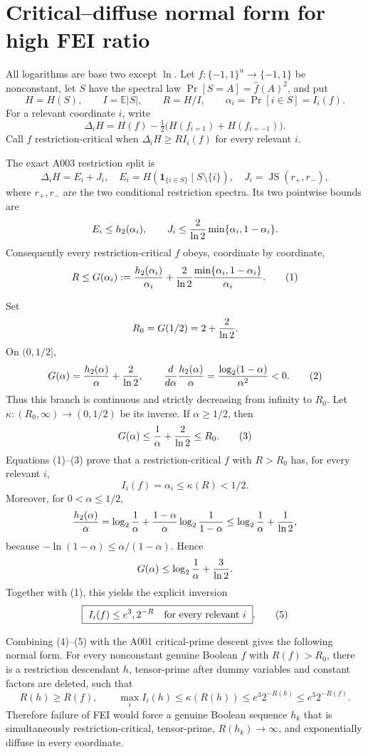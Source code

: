 \section*{Critical--diffuse normal form for high FEI ratio}

All logarithms are base two except \(\ln\).  Let \(f:\{-1,1\}^n\to
\{-1,1\}\) be nonconstant, let \(S\) have the spectral law
\(\Pr[S=A]=\widehat f(A)^2\), and put
\[
 H=H(S),\qquad I=\mathbb E|S|,\qquad R=H/I,
 \qquad \alpha_i=\Pr[i\in S]=I_i(f).
\]
For a relevant coordinate \(i\), write
\[
 \Delta_iH=H(f)-\tfrac12\bigl(H(f_{i=1})+H(f_{i=-1})\bigr).
\]
Call \(f\) restriction-critical when
\(\Delta_iH\ge R I_i(f)\) for every relevant \(i\).

The exact A003 restriction split is
\[
 \Delta_iH=E_i+J_i,
 \quad E_i=H(\mathbf1_{\{i\in S\}}\mid S\setminus\{i\}),
 \quad J_i=\operatorname{JS}(r_+,r_-),
\]
where \(r_+,r_-\) are the two conditional restriction spectra.  Its two
pointwise bounds are
\[
 E_i\le h_2(\alpha_i),\qquad
 J_i\le {2\over\ln2}\min\{\alpha_i,1-\alpha_i\}.
\]
Consequently every restriction-critical \(f\) obeys, coordinate by
coordinate,
\[
 R\le G(\alpha_i):={h_2(\alpha_i)\over\alpha_i}
   +{2\over\ln2}{\min\{\alpha_i,1-\alpha_i\}\over\alpha_i}. \tag{1}
\]

Set
\[
 R_0=G(1/2)=2+{2\over\ln2}.
\]
On \((0,1/2]\),
\[
 G(\alpha)={h_2(\alpha)\over\alpha}+{2\over\ln2},
 \qquad {d\over d\alpha}{h_2(\alpha)\over\alpha}
 ={\log_2(1-\alpha)\over\alpha^2}<0. \tag{2}
\]
Thus this branch is continuous and strictly decreasing from infinity to
\(R_0\).  Let \(\kappa:(R_0,\infty)\to(0,1/2)\) be its inverse.  If
\(\alpha\ge1/2\), then
\[
 G(\alpha)\le {1\over\alpha}+{2\over\ln2}\le R_0. \tag{3}
\]
Equations (1)--(3) prove that a restriction-critical \(f\) with \(R>R_0\)
has, for every relevant \(i\),
\[
 I_i(f)=\alpha_i\le\kappa(R)<1/2. \tag{4}
\]
Moreover, for \(0<\alpha\le1/2\),
\[
 {h_2(\alpha)\over\alpha}
 =\log_2{1\over\alpha}
  +{1-\alpha\over\alpha}\log_2{1\over1-\alpha}
 \le\log_2{1\over\alpha}+{1\over\ln2},
\]
because \(-\ln(1-\alpha)\le\alpha/(1-\alpha)\).  Hence
\[
 G(\alpha)\le\log_2{1\over\alpha}+{3\over\ln2}.
\]
Together with (1), this yields the explicit inversion
\[
 \boxed{\ I_i(f)\le e^3,2^{-R}\quad\hbox{for every relevant }i\ }.
 \tag{5}
\]

Combining (4)--(5) with the A001 critical-prime descent gives the following
normal form.  For every nonconstant genuine Boolean \(f\) with
\(R(f)>R_0\), there is a restriction descendant \(h\), tensor-prime after
dummy variables and constant factors are deleted, such that
\[
 R(h)\ge R(f),\qquad
 \max_i I_i(h)\le\kappa(R(h))\le e^3 2^{-R(h)}\le e^3 2^{-R(f)}. \tag{6}
\]
Therefore failure of FEI would force a genuine Boolean sequence \(h_k\)
that is simultaneously restriction-critical, tensor-prime,
\(R(h_k)\to\infty\), and exponentially diffuse in every coordinate.

